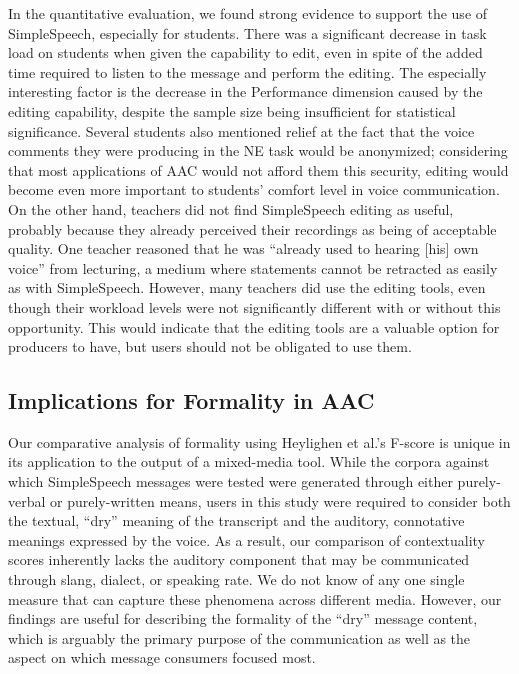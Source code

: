 In the quantitative evaluation, we found strong evidence to support the use of SimpleSpeech, especially for students.
There was a significant decrease in task load on students when given the capability to edit, even in spite of the added time required to listen to the message and perform the editing.
The especially interesting factor is the decrease in the Performance dimension caused by the editing capability, despite the sample size being insufficient for statistical significance. 
Several students also mentioned relief at the fact that the voice comments they were producing in the NE task would be anonymized; considering that most applications of AAC would not afford them this security, editing would become even more important to students' comfort level in voice communication.
On the other hand, teachers did not find SimpleSpeech editing as useful, probably because they already perceived their recordings as being of acceptable quality. 
One teacher reasoned that he was ``already used to hearing [his] own voice'' from lecturing, a medium where statements cannot be retracted as easily as with SimpleSpeech.
However, many teachers did use the editing tools, even though their workload levels were not significantly different with or without this opportunity.
This would indicate that the editing tools are a valuable option for producers to have, but users should not be obligated to use them.

\subsection{Implications for Formality in AAC}
Our comparative analysis of formality using Heylighen et al.'s F-score \cite{heylighen} is unique in its application to the output of a mixed-media tool.
While the corpora against which SimpleSpeech messages were tested were generated through either purely-verbal or purely-written means, users in this study were required to consider both the textual, ``dry'' meaning of the transcript and the auditory, connotative meanings expressed by the voice.
As a result, our comparison of contextuality scores inherently lacks the auditory component that may be communicated through slang, dialect, or speaking rate.
We do not know of any one single measure that can capture these phenomena across different media.
However, our findings are useful for describing the formality of the ``dry'' message content, which is arguably the primary purpose of the communication as well as the aspect on which message consumers focused most.

